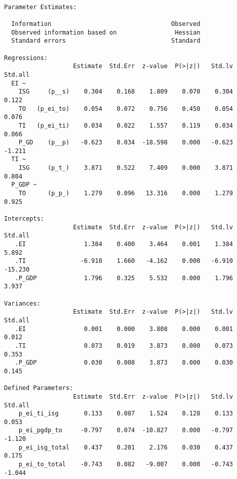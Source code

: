 \begin{verbatim}

Parameter Estimates:

  Information                                 Observed
  Observed information based on                Hessian
  Standard errors                             Standard

Regressions:
                   Estimate  Std.Err  z-value  P(>|z|)   Std.lv  Std.all
  EI ~                                                                  
    ISG     (p__s)    0.304    0.168    1.809    0.070    0.304    0.122
    TO   (p_ei_to)    0.054    0.072    0.756    0.450    0.054    0.076
    TI   (p_ei_ti)    0.034    0.022    1.557    0.119    0.034    0.066
    P_GD    (p__p)   -0.623    0.034  -18.598    0.000   -0.623   -1.211
  TI ~                                                                  
    ISG     (p_t_)    3.871    0.522    7.409    0.000    3.871    0.804
  P_GDP ~                                                               
    TO      (p_p_)    1.279    0.096   13.316    0.000    1.279    0.925

Intercepts:
                   Estimate  Std.Err  z-value  P(>|z|)   Std.lv  Std.all
   .EI                1.384    0.400    3.464    0.001    1.384    5.892
   .TI               -6.910    1.660   -4.162    0.000   -6.910  -15.230
   .P_GDP             1.796    0.325    5.532    0.000    1.796    3.937

Variances:
                   Estimate  Std.Err  z-value  P(>|z|)   Std.lv  Std.all
   .EI                0.001    0.000    3.808    0.000    0.001    0.012
   .TI                0.073    0.019    3.873    0.000    0.073    0.353
   .P_GDP             0.030    0.008    3.873    0.000    0.030    0.145

Defined Parameters:
                   Estimate  Std.Err  z-value  P(>|z|)   Std.lv  Std.all
    p_ei_ti_isg       0.133    0.087    1.524    0.128    0.133    0.053
    p_ei_pgdp_to     -0.797    0.074  -10.827    0.000   -0.797   -1.120
    p_ei_isg_total    0.437    0.201    2.176    0.030    0.437    0.175
    p_ei_to_total    -0.743    0.082   -9.007    0.000   -0.743   -1.044

\end{verbatim}
